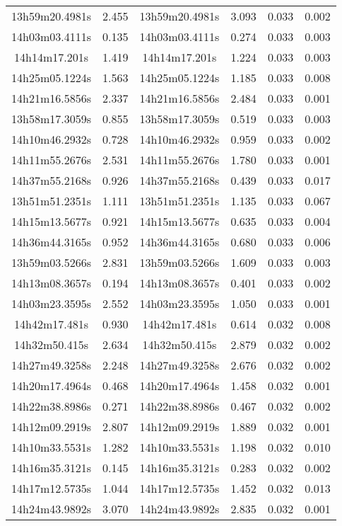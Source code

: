 \begin{table}
\begin{tabular}{cccccc}
13h59m20.4981s & 2.455 & 13h59m20.4981s & 3.093 & 0.033 & 0.002 \\
14h03m03.4111s & 0.135 & 14h03m03.4111s & 0.274 & 0.033 & 0.003 \\
14h14m17.201s & 1.419 & 14h14m17.201s & 1.224 & 0.033 & 0.003 \\
14h25m05.1224s & 1.563 & 14h25m05.1224s & 1.185 & 0.033 & 0.008 \\
14h21m16.5856s & 2.337 & 14h21m16.5856s & 2.484 & 0.033 & 0.001 \\
13h58m17.3059s & 0.855 & 13h58m17.3059s & 0.519 & 0.033 & 0.003 \\
14h10m46.2932s & 0.728 & 14h10m46.2932s & 0.959 & 0.033 & 0.002 \\
14h11m55.2676s & 2.531 & 14h11m55.2676s & 1.780 & 0.033 & 0.001 \\
14h37m55.2168s & 0.926 & 14h37m55.2168s & 0.439 & 0.033 & 0.017 \\
13h51m51.2351s & 1.111 & 13h51m51.2351s & 1.135 & 0.033 & 0.067 \\
14h15m13.5677s & 0.921 & 14h15m13.5677s & 0.635 & 0.033 & 0.004 \\
14h36m44.3165s & 0.952 & 14h36m44.3165s & 0.680 & 0.033 & 0.006 \\
13h59m03.5266s & 2.831 & 13h59m03.5266s & 1.609 & 0.033 & 0.003 \\
14h13m08.3657s & 0.194 & 14h13m08.3657s & 0.401 & 0.033 & 0.002 \\
14h03m23.3595s & 2.552 & 14h03m23.3595s & 1.050 & 0.033 & 0.001 \\
14h42m17.481s & 0.930 & 14h42m17.481s & 0.614 & 0.032 & 0.008 \\
14h32m50.415s & 2.634 & 14h32m50.415s & 2.879 & 0.032 & 0.002 \\
14h27m49.3258s & 2.248 & 14h27m49.3258s & 2.676 & 0.032 & 0.002 \\
14h20m17.4964s & 0.468 & 14h20m17.4964s & 1.458 & 0.032 & 0.001 \\
14h22m38.8986s & 0.271 & 14h22m38.8986s & 0.467 & 0.032 & 0.002 \\
14h12m09.2919s & 2.807 & 14h12m09.2919s & 1.889 & 0.032 & 0.001 \\
14h10m33.5531s & 1.282 & 14h10m33.5531s & 1.198 & 0.032 & 0.010 \\
14h16m35.3121s & 0.145 & 14h16m35.3121s & 0.283 & 0.032 & 0.002 \\
14h17m12.5735s & 1.044 & 14h17m12.5735s & 1.452 & 0.032 & 0.013 \\
14h24m43.9892s & 3.070 & 14h24m43.9892s & 2.835 & 0.032 & 0.001 \\

\end{tabular}
\end{table}
